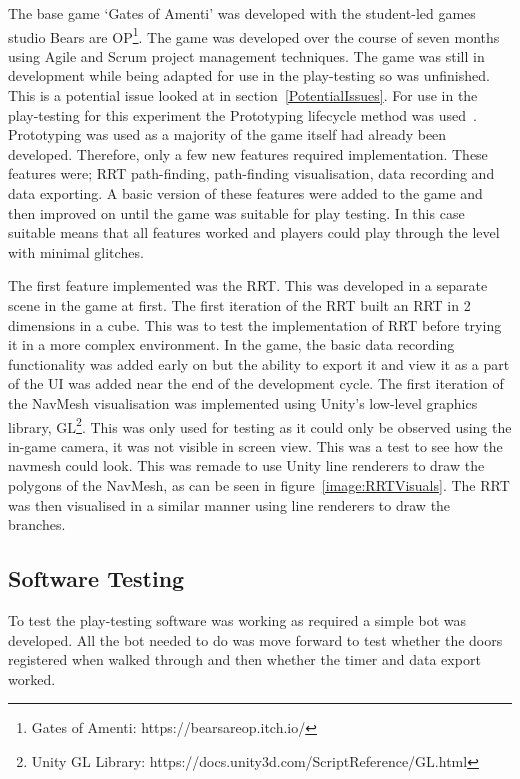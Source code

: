 \documentclass[journal]{IEEEtran}
\begin{document}
	The base game `Gates of Amenti' was developed with the student-led games studio Bears are OP\footnote[5]{Gates of Amenti: https://bearsareop.itch.io/}. The game was developed over the course of seven months using Agile and Scrum project management techniques. The game was still in development while being adapted for use in the play-testing so was unfinished. This is a potential issue looked at in section~\ref{PotentialIssues}. 
	For use in the play-testing for this experiment the Prototyping lifecycle method was used~\cite{isaias2015}. Prototyping was used as a majority of the game itself had already been developed. Therefore, only a few new features required implementation. These features were; RRT path-finding, path-finding visualisation, data recording and data exporting. A basic version of these features were added to the game and then improved on until the game was suitable for play testing. In this case suitable means that all features worked and players could play through the level with minimal glitches.
		
	The first feature implemented was the RRT. This was developed in a separate scene in the game at first. The first iteration of the RRT built an RRT in 2 dimensions in a cube. This was to test the implementation of RRT before trying it in a more complex environment.  In the game, the basic data recording functionality was added early on but the ability to export it and view it as a part of the UI was added near the end of the development cycle. The first iteration of the NavMesh visualisation was implemented using Unity's low-level graphics library, GL\footnote[5]{Unity GL Library: https://docs.unity3d.com/ScriptReference/GL.html}. This was only used for testing as it could only be observed using the in-game camera,  it was not visible in screen view. This was a test to see how the navmesh could look. This was remade to use Unity line renderers to draw the polygons of the NavMesh, as can be seen in figure~\ref{image:RRTVisuals}. The RRT was then visualised in a similar manner using line renderers to draw the branches. 
	
	\subsection{Software Testing} \label{softtest}
	To test the play-testing software was working as required a simple bot was developed. All the bot needed to do was move forward to test whether the doors registered when walked through and then whether the timer and data export worked.
	
\end{document}
